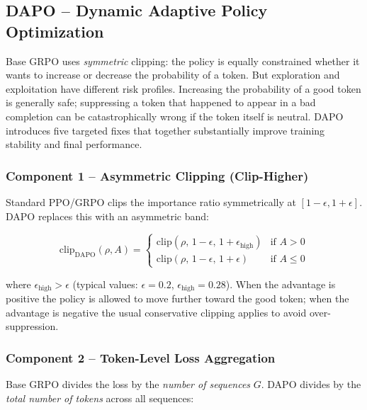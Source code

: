\subsection{DAPO -- Dynamic Adaptive Policy Optimization}
\label{sec:dapo}

\begin{intuitionbox}
Base GRPO uses \emph{symmetric} clipping: the policy is equally constrained whether it wants to increase or decrease the probability of a token. But exploration and exploitation have different risk profiles. Increasing the probability of a good token is generally safe; suppressing a token that happened to appear in a bad completion can be catastrophically wrong if the token itself is neutral. DAPO~\cite{yu2025dapo} introduces five targeted fixes that together substantially improve training stability and final performance.
\end{intuitionbox}

\subsubsection*{Component 1 -- Asymmetric Clipping (Clip-Higher)}
\label{component-1-asymmetric-clipping-clip-higher}

Standard PPO/GRPO clips the importance ratio symmetrically at $[1-\epsilon, 1+\epsilon]$. DAPO replaces this with an asymmetric band:

\[
\boxed{
    \mathrm{clip}_{\text{DAPO}}(\rho, A) =
    \begin{cases}
      \mathrm{clip}(\rho,\, 1-\epsilon,\, 1+\epsilon_{\text{high}}) & \text{if } A > 0 \\
      \mathrm{clip}(\rho,\, 1-\epsilon,\, 1+\epsilon) & \text{if } A \le 0
    \end{cases}
  }
\]

where $\epsilon_{\text{high}} > \epsilon$ (typical values: $\epsilon=0.2$, $\epsilon_{\text{high}}=0.28$). When the advantage is positive the policy is allowed to move further toward the good token; when the advantage is negative the usual conservative clipping applies to avoid over-suppression.

\subsubsection*{Component 2 -- Token-Level Loss Aggregation}
\label{component-2-token-level-loss-aggregation}

Base GRPO divides the loss by the \emph{number of sequences} $G$. DAPO divides by the \emph{total number of tokens} across all sequences:

